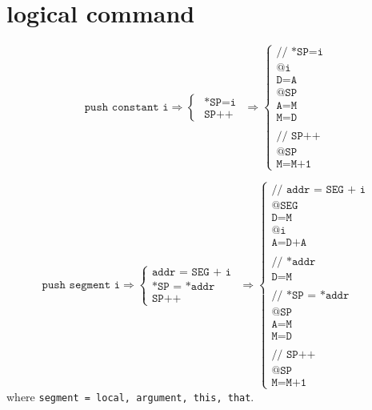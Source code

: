 \documentclass[a4paper]{book}
\begin{document}
\section{logical command}
\[
    \texttt{push constant i}
    \Rightarrow
    \begin{cases}
        \texttt{ *SP=i } \\
        \texttt{ SP++  }
    \end{cases}
    \Rightarrow
    \begin{cases}
        \texttt{// *SP=i } \\
        \texttt{@i       } \\
        \texttt{D=A      } \\
        \texttt{@SP      } \\
        \texttt{A=M      } \\
        \texttt{M=D      } \\
        \\
        \texttt{// SP++  } \\
        \texttt{@SP      } \\
        \texttt{M=M+1    }
    \end{cases}
\]


\[
    \texttt{push segment i}
    \Rightarrow
    \begin{cases}
        \texttt{addr =  SEG + i } \\
        \texttt{*SP = *addr     } \\
        \texttt{SP++            }
    \end{cases}
    \Rightarrow
    \begin{cases}
        \texttt{// addr = SEG + i } \\
        \texttt{@SEG              } \\
        \texttt{D=M               } \\
        \texttt{@i                } \\
        \texttt{A=D+A             } \\
        \\
        \texttt{// *addr          } \\
        \texttt{D=M               } \\
        \\
        \texttt{// *SP = *addr    } \\
        \texttt{@SP               } \\
        \texttt{A=M               } \\
        \texttt{M=D               } \\
        \\
        \texttt{// SP++           } \\
        \texttt{@SP               } \\
        \texttt{M=M+1             }
    \end{cases}
\]
where \texttt{segment = local, argument, this, that}.
\end{document}

